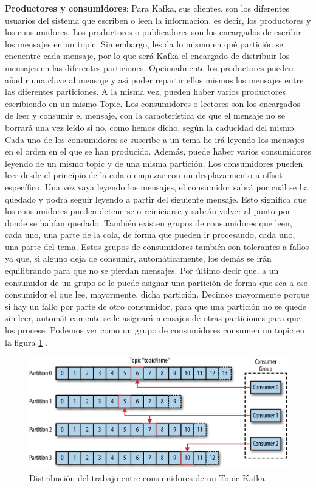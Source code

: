 \textbf{Productores y consumidores}: Para Kafka, sus clientes, son los
diferentes usuarios del sistema que escriben o leen la información, es
decir, los productores y los consumidores. Los productores o publicadores
son los encargados de escribir los mensajes en un topic. Sin embargo, les
da lo mismo en qué partición se encuentre cada mensaje, por lo que será
Kafka el encargado de distribuir los mensajes en las diferentes
particiones. Opcionalmente los productores pueden añadir una clave al
mensaje y así poder repartir ellos mismos los mensajes entre las diferentes
particiones. A la misma vez, pueden haber varios productores escribiendo en
un mismo Topic. Los consumidores o lectores son los encargados de leer y
consumir el mensaje, con la característica de que el mensaje no se borrará
una vez leído si no, como hemos dicho, según la caducidad del mismo. Cada
uno de los consumidores se suscribe a un tema he irá leyendo los mensajes
en el orden en el que se han producido. Además, puede haber varios
consumidores leyendo de un mismo topic y de una misma partición. Los
consumidores pueden leer desde el principio de la cola o empezar con un
desplazamiento u offset específico. Una vez vaya leyendo los mensajes, el
consumidor sabrá por cuál se ha quedado y podrá seguir leyendo a partir del
siguiente mensaje. Esto significa que los consumidores pueden detenerse o
reiniciarse y sabrán volver al punto por donde se habían quedado. También
existen grupos de consumidores que leen, cada uno, una parte de la cola, de
forma que pueden ir procesando, cada uno, una parte del tema. Estos grupos
de consumidores también son tolerantes a fallos ya que, si alguno deja de
consumir, automáticamente, los demás se irán equilibrando para que no se
pierdan mensajes. Por último decir que, a un consumidor de un grupo se le
puede asignar una partición de forma que sea a ese consumidor el que lee,
mayormente, dicha partición. Decimos mayormente porque si hay un fallo por
parte de otro consumidor, para que una partición no se quede sin leer,
automáticamente se le asignará mensajes de otras particiones para que los
procese. Podemos ver como un grupo de consumidores consumen un topic en la
figura \ref{Kfk-img-2} \cite{Kfk-1}.

\begin{figure}[htp]
\centering
\includegraphics[scale=0.30]{Imagenes/kafka2.png}
\caption{Distribución del trabajo entre consumidores de un Topic Kafka.}
\label{Kfk-img-2}
\end{figure}

